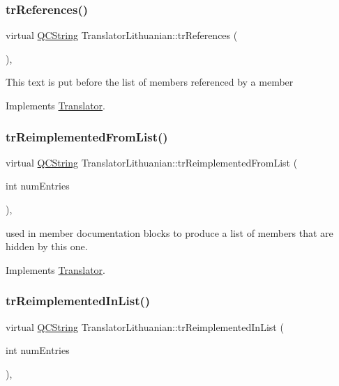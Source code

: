 \subsubsection{\texorpdfstring{trReferences()}{trReferences()}}
{\footnotesize\ttfamily virtual \mbox{\hyperlink{class_q_c_string}{Q\+C\+String}} Translator\+Lithuanian\+::tr\+References (\begin{DoxyParamCaption}{ }\end{DoxyParamCaption})\hspace{0.3cm}{\ttfamily [inline]}, {\ttfamily [virtual]}}

This text is put before the list of members referenced by a member 

Implements \mbox{\hyperlink{class_translator}{Translator}}.

\mbox{\label{class_translator_lithuanian_a4d44dd3f12fa2c992d978fd2b0a164ab}} 
\subsubsection{\texorpdfstring{trReimplementedFromList()}{trReimplementedFromList()}}
{\footnotesize\ttfamily virtual \mbox{\hyperlink{class_q_c_string}{Q\+C\+String}} Translator\+Lithuanian\+::tr\+Reimplemented\+From\+List (\begin{DoxyParamCaption}\item[{int}]{num\+Entries }\end{DoxyParamCaption})\hspace{0.3cm}{\ttfamily [inline]}, {\ttfamily [virtual]}}

used in member documentation blocks to produce a list of members that are hidden by this one. 

Implements \mbox{\hyperlink{class_translator}{Translator}}.

\mbox{\label{class_translator_lithuanian_a20465d684fcd5a401eaa70bbe311e70a}} 
\subsubsection{\texorpdfstring{trReimplementedInList()}{trReimplementedInList()}}
{\footnotesize\ttfamily virtual \mbox{\hyperlink{class_q_c_string}{Q\+C\+String}} Translator\+Lithuanian\+::tr\+Reimplemented\+In\+List (\begin{DoxyParamCaption}\item[{int}]{num\+Entries }\end{DoxyParamCaption})\hspace{0.3cm}{\ttfamily [inline]}, {\ttfamily [virtual]}}


